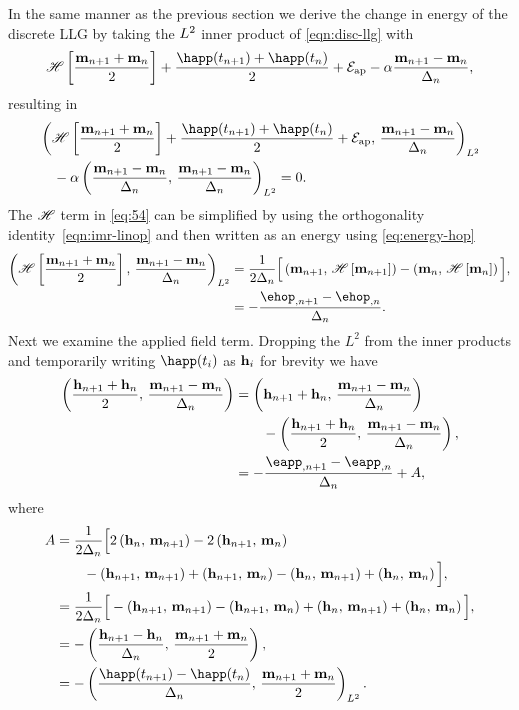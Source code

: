 In the same manner as the previous section we derive the change in energy of the discrete LLG by taking the $L^2$ inner product of \cref{eqn:disc-llg} with
\begin{equation}
  \mphop + \frac{\happ(t_{n+1}) + \happ(t_n)}{2} + \happerror - \dampc \mpdmdt,
\end{equation}
resulting in
\begin{equation}
  \begin{aligned}
    &\ltip{\mphop + \frac{\happ(t_{n+1}) + \happ(t_n)}{2} + \happerror}{\mpdmdt} \\
    & \quad - \dampc \ltip{\mpdmdt}{\mpdmdt} = 0.
    \label{eq:54}
  \end{aligned}
\end{equation}
The $\mathscr{H}$ term in \cref{eq:54} can be simplified by using the orthogonality identity~\cref{eqn:imr-linop} and then written as an energy using \cref{eq:energy-hop}
\begin{equation}
  \begin{aligned}
    \ltip{\mphop}{\mpdmdt} 
    &= \frac{1}{2\dtn} \Big[\ip{\mv_{n+1}}{\hop \left[\mv_{n+1} \right]}
    - \ip{\mv_{n}}{ \hop\left[ \mv_{n} \right]} \Big], \\
    &= -\frac{\ehop_{,n+1} - \ehop_{,n}}{\dtn}.
  \end{aligned}
  \label{eq:50}
\end{equation}
Next we examine the applied field term.
Dropping the $L^2$ from the inner products and temporarily writing $\happ(t_i)$ as $\mathbf{h}_i$ for brevity we have
\begin{equation}
  \begin{aligned}
    \ip{\frac{\hv_{n+1} + \hv_n}{2}}{\mpdmdt}
    &= \ip{\hv_{n+1} + \hv_n}{\mpdmdt} \\
    & \qquad - \ip{\frac{\hv_{n+1} + \hv_n}{2}}{\mpdmdt}, \\
    &= -\frac{\eapp_{, n+1} - \eapp_{, n}}{\dtn}  + A,
  \end{aligned}
\end{equation}
where
\begin{equation}
  \begin{aligned}
    A &= \frac{1}{2\dtn}\Big[ 2\ip{\hv_n}{\mv_{n+1}} - 2\ip{\hv_{n+1}}{\mv_n} \\
    & \qquad - \ip{\hv_{n+1}}{\mv_{n+1}} +\ip{\hv_{n+1}}{\mv_n} 
    - \ip{\hv_n}{\mv_{n+1}} + \ip{\hv_n}{\mv_n} \Big], \\
    &= \frac{1}{2\dtn}\Big[ - \ip{\hv_{n+1}}{\mv_{n+1}} - \ip{\hv_{n+1}}{\mv_n} 
    + \ip{\hv_n}{\mv_{n+1}} + \ip{\hv_n}{\mv_n} \Big], \\
    &= - \ip{ \frac{\hv_{n+1} - \hv_n}{\dtn} }{ \frac{\mv_{n+1} + \mv_n}{2} }, \\
    &= - \ltip{ \frac{\happ(t_{n+1}) - \happ(t_n)}{\dtn} }{ \frac{\mv_{n+1} + \mv_n}{2} }.
    \label{eq:52}
  \end{aligned}
\end{equation}
